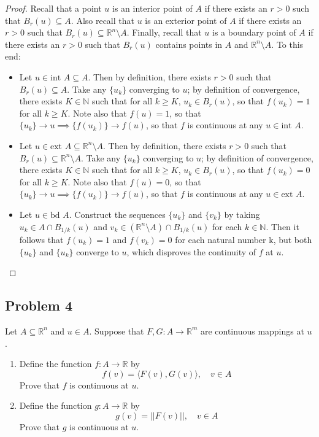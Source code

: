 \documentclass{article}
\begin{document}
\begin{proof}
Recall that a point $u$ is an interior point of $A$ if there exists an $r>0$ such that $B_r(u) \subseteq A$. Also recall that $u$ is an exterior point of $A$ if there exists an $r>0$ such that $B_r(u) \subseteq \mathbb{R}^n \setminus A$. Finally, recall that $u$ is a boundary point of $A$ if there exists an $r > 0$ such that $B_r(u)$ contains points in $A$ and $\mathbb{R}^n \setminus A$. To this end:
\begin{itemize}
    \item Let $u \in \text{int } A \subseteq A$. Then by definition, there exists $r>0$ such that $B_r(u) \subseteq A$. Take any $\{u_k\}$ converging to $u$; by definition of convergence, there exists $K \in \mathbb{N}$ such that for all $k \geq K$, $u_k \in B_r(u)$, so that $f(u_k) = 1$ for all $k \geq K$. Note also that $f(u) = 1$, so that $\{u_k\} \to u \implies \{f(u_k)\} \to f(u)$, so that $f$ is continuous at any $u \in \text{int } A$.
    \item Let $u \in \text{ext } A \subseteq \mathbb{R}^n \setminus A$. Then by definition, there exists $r>0$ such that $B_r(u) \subseteq \mathbb{R}^n \setminus A$. Take any $\{u_k\}$ converging to $u$; by definition of convergence, there exists $K \in \mathbb{N}$ such that for all $k \geq K$, $u_k \in B_r(u)$, so that $f(u_k) = 0$ for all $k \geq K$. Note also that $f(u) = 0$, so that $\{u_k\} \to u \implies \{f(u_k)\} \to f(u)$, so that $f$ is continuous at any $u \in \text{ext } A$.
    \item Let $u \in \text{bd } A$. Construct the sequences $\{u_k\}$ and $\{v_k\}$ by taking $u_k \in A \cap B_{1/k}(u)$ and $v_k \in (\mathbb{R}^n \setminus A) \cap B_{1/k}(u)$ for each $k \in \mathbb{N}$. Then it follows that $f(u_k) = 1$ and $f(v_k) = 0$ for each natural number k, but both $\{u_k\}$ and $\{u_k\}$ converge to $u$, which disproves the continuity of $f$ at $u$. 
\end{itemize}

\end{proof}

\subsection*{Problem 4}

Let $A \subseteq \mathbb{R}^n$ and $u \in A$. Suppose that $F, G \colon A \to \mathbb{R}^m$ are continuous mappings at $u$. 

\begin{enumerate}[label = \alph*)]
    \item Define the function $f \colon A \to \mathbb{R}$ by
    \[ f(v) = \langle F(v), G(v) \rangle, \quad v \in A\]
    Prove that $f$ is continuous at $u$.
    \item Define the function $g \colon A \to \mathbb{R}$ by
    \[ g(v) = ||F(v)||, \quad v \in A\]
    Prove that $g$ is continuous at $u$.
    
\end{enumerate}
\end{document}
